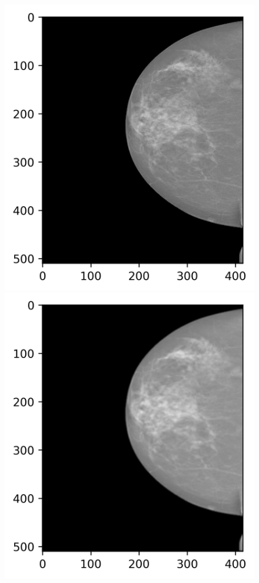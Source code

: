 \begin{figure}
\begin{multicols}{2}
    \includegraphics[width=\linewidth]{Graphics/mm-rescaled.png}\par 
    \includegraphics[width=\linewidth]{Graphics/mm-smooth.png}\par 

\end{multicols}
\end{figure}
